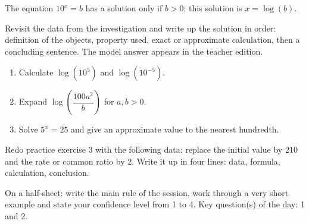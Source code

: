 \begin{traceecrite}The equation $10^x=b$ has a solution only if $b>0$; this solution is $x=\log(b)$.\end{traceecrite}

\begin{exemple}
Revisit the data from the investigation and write up the solution in order: definition of the objects, property used, exact or approximate calculation, then a concluding sentence. The model answer appears in the teacher edition.
\end{exemple}

\begin{exercice}[-- essentiel]
\begin{enumerate}\item Calculate $\log(10^5)$ and $\log(10^{-5})$.\item Expand $\log\!\left(\dfrac{100a^2}{b}\right)$ for $a,b>0$.\item Solve $5^x=25$ and give an approximate value to the nearest hundredth.\end{enumerate}
\end{exercice}


\begin{dm}Redo practice exercise 3 with the following data: replace the initial value by $210$ and the rate or common ratio by $2$. Write it up in four lines: data, formula, calculation, conclusion.\end{dm}

\begin{sortie}On a half-sheet: write the main rule of the session, work through a very short example and state your confidence level from 1 to 4. Key question(s) of the day: 1 and 2.\end{sortie}

